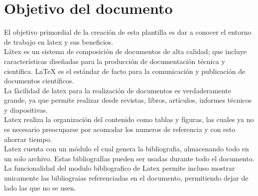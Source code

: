\chapter{Objetivo del documento}


El objetivo primordial de la creación de esta plantilla es dar a conocer el entorno de trabajo en latex y sus beneficios.
\\

Látex es un sistema de composición de documentos de alta calidad; que incluye características diseñadas para la producción de documentación técnica y científica. LaTeX es el estándar de facto para la comunicación y publicación de documentos científicos. \cite{Latex}
\\
La fàcilidad de latex para la realización de documentos es verdaderamente grande, ya que permite realizar desde revistas, libros, articulos, informes técnicos y diapositivas.
\\
Latex realiza la organización del contenido como tablas y fíguras, las cuales ya no es necesario preocuparse por acomodar los numeros de referencia y con esto ahorrar tiempo.
\\
Latex cuenta con un módulo el cual genera la bibliografia, almacenando todo en un solo archivo. Estas bibliografías pueden ser usadas durante todo el documento. La funcionalidad del modulo bibliografico de Latex permite incluso mostrar unicamente las bibliograias referenciadas en el documento, permitiendo dejar de lado las que no se usen.